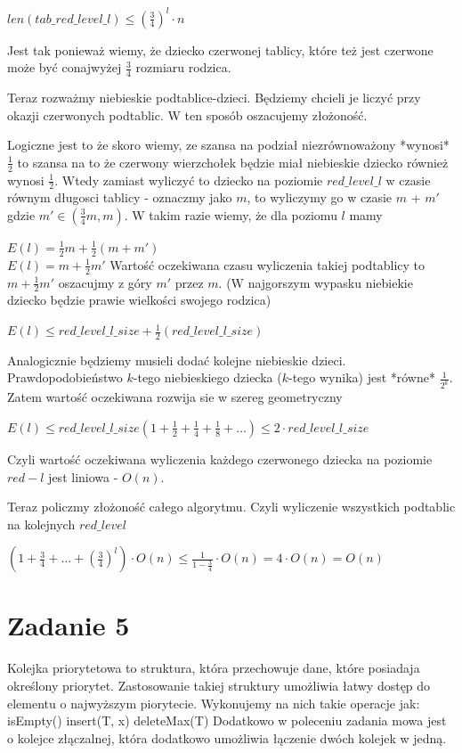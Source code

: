 \documentclass[12pt]{article}
\begin{document}
$len(tab\_red\_level\_l) \le\left(\frac{3}{4}\right)^l\cdot n$

Jest tak ponieważ wiemy, że dziecko czerwonej tablicy, które też jest czerwone może być conajwyżej $\frac{3}{4}$ rozmiaru rodzica.

Teraz rozważmy niebieskie podtablice-dzieci.
Będziemy chcieli je liczyć przy okazji czerwonych podtablic. W ten sposób oszacujemy złożoność.

Logiczne jest to że skoro wiemy, ze szansa na podział niezrównoważony *wynosi* $\frac{1}{2}$ to szansa na to że czerwony wierzchołek będzie miał niebieskie dziecko również wynosi $\frac{1}{2}$.
Wtedy zamiast wyliczyć to dziecko na poziomie $red\_level\_l$ w czasie równym długosci tablicy - oznaczmy jako $m$, to wyliczymy go w czasie $m$ + $m'$ gdzie $m' \in (\frac{3}{4}m,m)$.
W takim razie wiemy, że dla poziomu $l$ mamy

$E(l) = \frac{1}{2} m + \frac{1}{2} (m+m')$\\
$E(l) = m + \frac{1}{2} m'$
Wartość oczekiwana czasu wyliczenia takiej podtablicy to $m + \frac{1}{2}m'$ oszacujmy z góry $m'$ przez $m$. (W najgorszym wypasku niebiekie dziecko będzie prawie wielkości swojego rodzica)

$E(l) \le red\_level\_l\_size + \frac{1}{2}( red\_level\_l\_size)$

Analogicznie będziemy musieli dodać kolejne niebieskie dzieci. Prawdopodobieństwo $k$-tego niebieskiego dziecka ($k$-tego wynika) jest *równe* $\frac{1}{2^k}$. Zatem wartość oczekiwana rozwija sie w szereg geometryczny

$E(l) \le red\_level\_l\_size(1 + \frac{1}{2} + \frac{1}{4} + \frac{1}{8} + \ldots) \le 2\cdot  red\_level\_l\_size$

Czyli wartość oczekiwana wyliczenia każdego czerwonego dziecka na poziomie $red-l$ jest liniowa - $O(n)$.

Teraz policzmy złożoność całego algorytmu.
Czyli wyliczenie wszystkich podtablic na kolejnych $red\_level$ 


$\left(1+ \frac{3}{4} + \ldots +\left(\frac{3}{4}\right)^l\right) \cdot O(n) \le \frac{1}{1- \frac{3}{4}} \cdot O(n) = 4 \cdot O(n) = O(n)$

\section{Zadanie 5}

Kolejka priorytetowa to struktura, która przechowuje dane, które posiadaja określony priorytet. Zastosowanie takiej struktury umożliwia łatwy dostęp do elementu o najwyższym piorytecie.
Wykonujemy na nich takie operacje jak:
isEmpty()
insert(T, x)
deleteMax(T)
Dodatkowo w poleceniu zadania mowa jest o kolejce złączalnej, która dodatkowo umożliwia łączenie dwóch kolejek w jedną.
\end{document}
